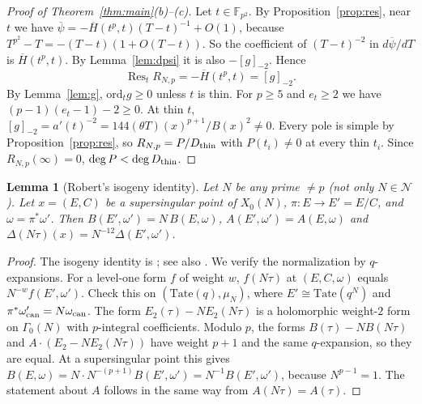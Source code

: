 \documentclass[11pt,a4paper]{article}
\numberwithin{equation}{section}
\newtheorem{lemma}[theorem]{Lemma}
\theoremstyle{definition}
\theoremstyle{remark}
\newcommand{\Fq}{\mathbb F_{p^2}}
\newcommand{\Res}{\operatorname{Res}}
\begin{document}
\begin{proof}[Proof of Theorem~\ref{thm:main}(b)--(c)]
Let $t\in\Fq$. By Proposition~\ref{prop:res}, near $t$ we have
$\overline\psi=-\overline H(t^p,t)(T-t)^{-1}+O(1)$, because $T^{p^2}-T=-(T-t)(1+O(T-t))$. So the
coefficient of $(T-t)^{-2}$ in $d\overline\psi/dT$ is $\overline H(t^p,t)$. By Lemma~\ref{lem:dpsi}
it is also $-[g]_{-2}$. Hence
\[
\Res_tR_{N,p}=-\overline H(t^p,t)=[g]_{-2}.
\]
By Lemma~\ref{lem:g}, $\mathrm{ord}_tg\ge0$ unless $t$ is thin. For $p\ge5$ and $e_t\ge2$ we have
$(p-1)(e_t-1)-2\ge0$. At thin $t$, $[g]_{-2}=a'(t)^{-2}=144(\theta T)(x)^{p+1}/B(x)^2\ne0$. Every pole is
simple by Proposition~\ref{prop:res}, so $R_{N,p}=P/D_{\rm thin}$ with $P(t_i)\ne0$ at every thin
$t_i$. Since $R_{N,p}(\infty)=0$, $\deg P<\deg D_{\rm thin}$.
\end{proof}

\begin{lemma}[Robert's isogeny identity]\label{lem:Bisog}
Let $N$ be any prime $\ne p$ (not only $N\in\mathcal N$). Let $x=(E,C)$ be a supersingular point of
$X_0(N)$, $\pi:E\to E'=E/C$, and $\omega=\pi^*\omega'$. Then
$B(E',\omega')=N\,B(E,\omega)$, $A(E',\omega')=A(E,\omega)$ and
$\Delta(N\tau)(x)=N^{-12}\Delta(E',\omega')$.
\end{lemma}
\begin{proof}
The isogeny identity is \citet[Th\'eor\`eme B; \S3.3, Lemma~7]{Robert80}; see also
\citet[Lemma~2.2]{Baker98}. We verify the normalization by $q$-expansions.
For a level-one form $f$ of weight $w$, $f(N\tau)$ at $(E,C,\omega)$ equals $N^{-w}f(E',\omega')$. Check
this on $(\mathrm{Tate}(q),\mu_N)$, where $E'\cong\mathrm{Tate}(q^N)$ and
$\pi^*\omega_{\rm can}'=N\omega_{\rm can}$. The form $E_2(\tau)-NE_2(N\tau)$ is a holomorphic
weight-$2$ form on $\Gamma_0(N)$ with $p$-integral coefficients. Modulo $p$, the forms
$B(\tau)-NB(N\tau)$ and $A\cdot(E_2-NE_2(N\tau))$ have weight $p+1$ and the same $q$-expansion, so they
are equal. At a supersingular point this gives $B(E,\omega)=N\cdot N^{-(p+1)}B(E',\omega')=N^{-1}B(E',\omega')$,
because $N^{p-1}=1$. The statement about $A$ follows in the same way from $A(N\tau)=A(\tau)$.
\end{proof}
\end{document}
